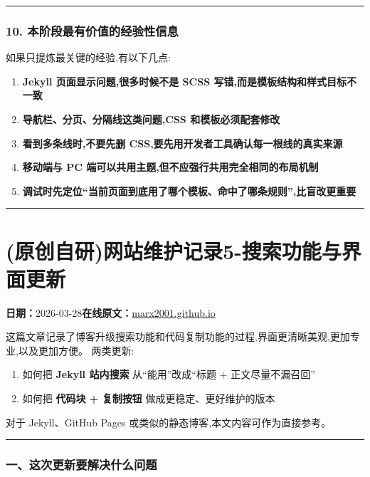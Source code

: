 \documentclass[lang=cn,scheme=chinese,color=blue,device=normal,toc=onecol,math=cm]{elegantbook}
\begin{document}
\medskip\hrule\medskip


\subsubsection{10. 本阶段最有价值的经验性信息}


如果只提炼最关键的经验,有以下几点:\par


\begin{enumerate}
\item \textbf{Jekyll 页面显示问题,很多时候不是 SCSS 写错,而是模板结构和样式目标不一致}
\item \textbf{导航栏、分页、分隔线这类问题,CSS 和模板必须配套修改}
\item \textbf{看到多条线时,不要先删 CSS,要先用开发者工具确认每一根线的真实来源}
\item \textbf{移动端与 PC 端可以共用主题,但不应强行共用完全相同的布局机制}
\item \textbf{调试时先定位“当前页面到底用了哪个模板、命中了哪条规则”,比盲改更重要}
\end{enumerate}


\medskip\hrule\medskip



\section{(原创自研)网站维护记录5-搜索功能与界面更新}
\begin{articlemeta}
\textbf{日期：}2026-03-28\hfill\textbf{在线原文：}\href{https://marx2001.github.io/sci-note\_posts/20260327deploy/}{marx2001.github.io}
\end{articlemeta}

这篇文章记录了博客升级搜索功能和代码复制功能的过程,界面更清晰美观,更加专业,以及更加方便。 两类更新:\par


\begin{enumerate}
\item 如何把 \textbf{Jekyll 站内搜索} 从“能用”改成“标题 + 正文尽量不漏召回”
\item 如何把 \textbf{代码块 + 复制按钮} 做成更稳定、更好维护的版本
\end{enumerate}


对于 Jekyll、GitHub Pages 或类似的静态博客,本文内容可作为直接参考。\par


\medskip\hrule\medskip


\subsubsection{一、这次更新要解决什么问题}
\end{document}
